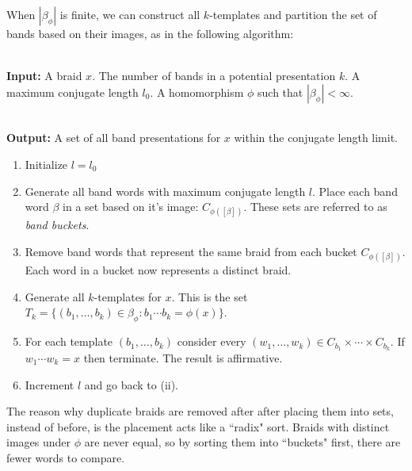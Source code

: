 \documentclass[12pt]{thesis}
\begin{document}
When $|\beta_{\phi}|$ is finite, we can construct all $k$-templates
and partition the set of bands based on their images,
as in the following algorithm:

\begin{algorithm}
    \label{alg:templated-search}
    ~\\
    \textbf{Input:} A braid $x$.
                    The number of bands in a potential presentation $k$.
                    A maximum conjugate length $l_{0}$.
                    A homomorphism $\phi$ such that $|\beta_{\phi}| < \infty$.

    ~\\
    \textbf{Output:} A set of all band presentations for $x$ within the conjugate length limit. 

    \begin{enumerate}
        \item Initialize $l = l_{0}$
        \item Generate all band words with maximum conjugate length $l$.
            Place each band word $\beta$ in a set based on it's image: $C_{\phi([\beta])}$.
            These sets are referred to as \textit{band buckets}.

        \item Remove band words that represent the same braid from each bucket $C_{\phi([\beta])}$.
              Each word in a bucket now represents a distinct braid.

        \item Generate all $k$-templates for $x$.
            This is the set $T_{k} = \{ (b_{1}, \ldots, b_{k}) \in \beta_{\phi} \colon b_{1} \cdots b_{k} = \phi(x) \}$.

        \item For each template $(b_{1}, \ldots, b_{k})$
            consider every $(w_{1}, \ldots, w_{k}) \in C_{b_{1}} \times \cdots \times C_{b_{k}}$.
            If $w_{1} \cdots w_{k} = x$
            then terminate. The result is affirmative.

        \item Increment $l$ and go back to (ii).
    \end{enumerate}
\end{algorithm}

The reason why duplicate braids are removed after after placing them
into sets, instead of before, is the placement acts like a ``radix" sort.
Braids with distinct images under $\phi$ are never equal,
so by sorting them into ``buckets" first, there are fewer words to compare.
\end{document}
